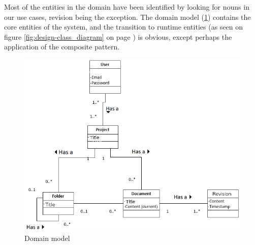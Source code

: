 Most of the entities in the \SOP domain have been identified by looking for nouns in our use cases, revision being the exception.
The domain model (\ref{fig:domain-model}) contains the core entities of the \SOP system, and the transition to runtime entities (as seen on figure \ref{fig:design-class_diagram} on page \pageref{fig:design-class_diagram}) is obvious, except perhaps the application of the composite pattern.
\begin{figure}[H]
	\centering
	\includegraphics[width=1\textwidth]{Software_analysis/graphics/Domain_model.png}
	\caption{Domain model}
	\label{fig:domain-model}
\end{figure}
	